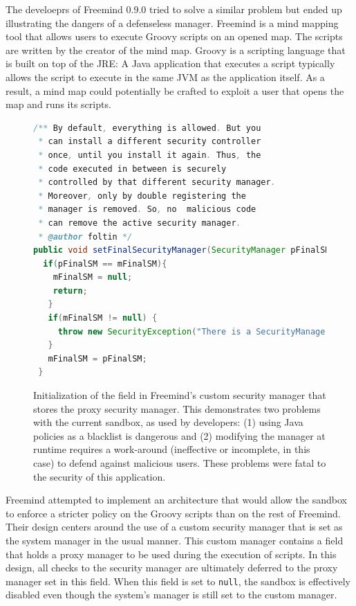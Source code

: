 \documentclass{sig-alternate}
\begin{document}
The develoeprs of Freemind 0.9.0 tried to solve a similar problem but ended up illustrating
the dangers of a defenseless manager. Freemind is a mind mapping tool
that allows users to execute Groovy scripts on an opened map. The
scripts are written by the creator of the mind map. Groovy is a scripting
language that is built on top of the JRE: A Java application that
executes a script typically allows the script to execute in the same
JVM as the application itself. As a result, a mind map could potentially
be crafted to exploit a user that opens the map and runs its scripts.

\begin{figure}
\begin{lstlisting}[language=Java,firstnumber=31]
/** By default, everything is allowed. But you
 * can install a different security controller
 * once, until you install it again. Thus, the
 * code executed in between is securely
 * controlled by that different security manager.  
 * Moreover, only by double registering the
 * manager is removed. So, no  malicious code 
 * can remove the active security manager.  
 * @author foltin */
public void setFinalSecurityManager(SecurityManager pFinalSM) {
  if(pFinalSM == mFinalSM){
    mFinalSM = null;
    return;
   } 		
   if(mFinalSM != null) {
     throw new SecurityException("There is a SecurityManager installed already."); 		
   } 		
   mFinalSM = pFinalSM;
 }	
\end{lstlisting}
\caption{Initialization of the field in Freemind's custom security
  manager\label{fig:Freemind-Security-Manager} that stores the proxy security
  manager. This demonstrates two problems with the current sandbox, as used by developers: (1) 
  using Java policies as a blacklist is
  dangerous and (2) modifying the manager at runtime requires 
  a work-around (ineffective or incomplete, in this case) to defend against malicious
  users. These problems were fatal to the security of this application.}
\end{figure}

Freemind attempted to implement an architecture that would allow the
sandbox to enforce a stricter policy on the Groovy scripts than on
the rest of Freemind. Their design centers around the use of a custom
security manager that is set as the system manager in the usual manner.
This custom manager contains a field that holds a proxy manager to be used during the execution of
scripts. In this design, all checks to the security manager are ultimately
deferred to the proxy manager set in this field. When
this field is set to \texttt{null}, the sandbox is effectively disabled
even though the system's manager is still set to the custom manager.
\end{document}
